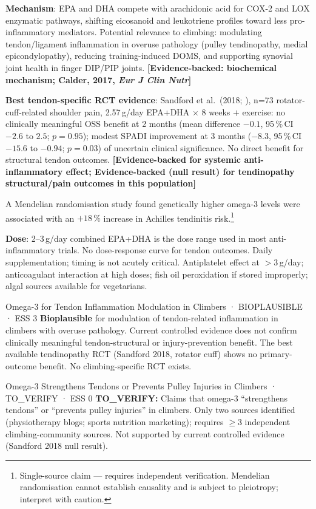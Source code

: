 \textbf{Mechanism}: EPA and DHA compete with arachidonic acid for COX-2 and LOX enzymatic pathways, shifting eicosanoid and leukotriene profiles toward less pro-inflammatory mediators. Potential relevance to climbing: modulating tendon/ligament inflammation in overuse pathology (pulley tendinopathy, medial epicondylopathy), reducing training-induced DOMS, and supporting synovial joint health in finger DIP/PIP joints. \textbf{[Evidence-backed: biochemical mechanism; Calder, 2017, \textit{Eur J Clin Nutr}]}

\textbf{Best tendon-specific RCT evidence}: Sandford et al.\ (2018; \cite{SSWL18}), n=73 rotator-cuff-related shoulder pain, 2.57\,g/day EPA+DHA $\times$ 8 weeks $+$ exercise: no clinically meaningful OSS benefit at 2 months (mean difference $-0.1$, 95\,\%\,CI $-2.6$ to $2.5$; $p{=}0.95$); modest SPADI improvement at 3 months ($-8.3$, 95\,\%\,CI $-15.6$ to $-0.94$; $p{=}0.03$) of uncertain clinical significance. No direct benefit for structural tendon outcomes. \textbf{[Evidence-backed for systemic anti-inflammatory effect; Evidence-backed (null result) for tendinopathy structural/pain outcomes in this population]}

A Mendelian randomisation study found genetically higher omega-3 levels were associated with an $+18\,\%$ increase in Achilles tendinitis risk.\footnote{Single-source claim --- requires independent verification. Mendelian randomisation cannot establish causality and is subject to pleiotropy; interpret with caution.}

\textbf{Dose}: 2--3\,g/day combined EPA+DHA is the dose range used in most anti-inflammatory trials. No dose-response curve for tendon outcomes. Daily supplementation; timing is not acutely critical. Antiplatelet effect at $>$3\,g/day; anticoagulant interaction at high doses; fish oil peroxidation if stored improperly; algal sources available for vegetarians.

\begin{bioplausbox}{Omega-3 for Tendon Inflammation Modulation in Climbers · BIOPLAUSIBLE · ESS 3}
\textbf{Bioplausible} for modulation of tendon-related inflammation in climbers with overuse pathology. Current controlled evidence does not confirm clinically meaningful tendon-structural or injury-prevention benefit. The best available tendinopathy RCT (Sandford 2018, rotator cuff) shows no primary-outcome benefit. No climbing-specific RCT exists.
\end{bioplausbox}

\begin{toverifybox}{Omega-3 Strengthens Tendons or Prevents Pulley Injuries in Climbers · TO\_VERIFY · ESS 0}
\textbf{TO\_VERIFY:} Claims that omega-3 ``strengthens tendons'' or ``prevents pulley injuries'' in climbers. Only two sources identified (physiotherapy blogs; sports nutrition marketing); requires $\geq$3 independent climbing-community sources. Not supported by current controlled evidence (Sandford 2018 null result).
\end{toverifybox}

